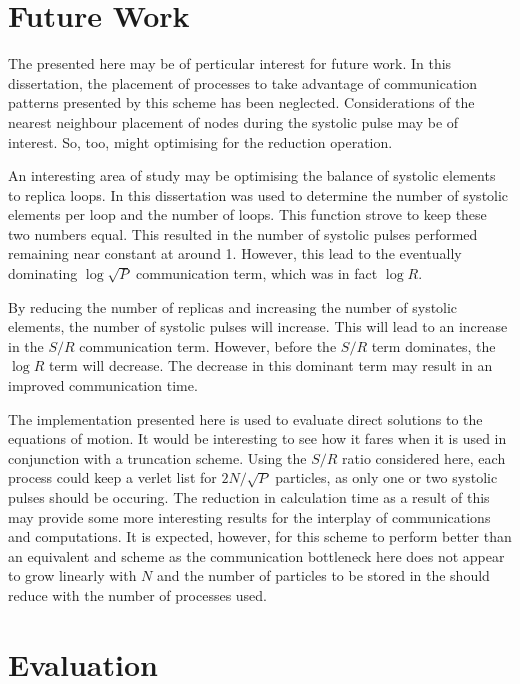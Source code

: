 \section{Future Work}

The \replicatedsystolicloop{} presented here may be of perticular
interest for future work.
%
In this dissertation, the placement of processes to take advantage
of communication patterns presented by this scheme has been neglected.
%
Considerations of the nearest neighbour placement of nodes during the
systolic pulse may be of interest.
%
So, too, might optimising for the reduction operation.

An interesting area of study may be optimising the balance of
systolic elements to replica loops.
%
In this dissertation \mpidimscreate{} was used to determine the
number of systolic elements per loop and the number of loops.
%
This function strove to keep these two numbers equal.
%
This resulted in the number of systolic pulses performed remaining
near constant at around 1.
%
However, this lead to the eventually dominating $\log{\sqrt{P}}$
communication term, which was in fact $\log{R}$.

By reducing the number of replicas and increasing the number of
systolic elements, the number of systolic pulses will increase.
%
This will lead to an increase in the $S/R$ communication term.
%
However, before the $S/R$ term dominates, the $\log{R}$ term will
decrease.
%
The decrease in this dominant term may result in an improved
communication time.

The implementation presented here is used to evaluate direct
solutions to the equations of motion.
%
It would be interesting to see how it fares when it is used in
conjunction with a truncation scheme.
%
Using the $S/R$ ratio considered here, each process could
keep a verlet list for $2N/\sqrt{P}$ particles, as only one
or two systolic pulses should be occuring.
%
The reduction in calculation time as a result of this may
provide some more interesting results for the interplay
of communications and computations.
%
It is expected, however, for this scheme to perform better than
an equivalent \replicateddata{} and \verletlist{} scheme as
the communication bottleneck here does not appear to grow linearly
with $N$ and the number of particles to be stored in the \verletlist{}
should reduce with the number of processes used.


\section{Evaluation}

